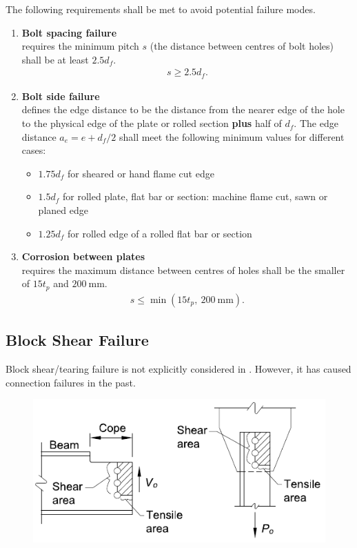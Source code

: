 The following requirements shall be met to avoid potential failure modes.
\begin{figure}[H]
\centering
\end{figure}
\begin{enumerate}
\item \textbf{Bolt spacing failure}\\
 requires the minimum pitch $s$ (the distance between centres of bolt holes) shall be at least $2.5d_f$.
\begin{gather}
s\geqslant2.5d_f.
\end{gather}
\item \textbf{Bolt side failure}\\
 defines the edge distance to be the distance from the nearer edge of the hole to the physical edge of the plate or rolled section \textbf{plus} half of $d_f$. The edge distance $a_e=e+d_f/2$ shall meet the following minimum values for different cases:
\begin{itemize}
\item $1.75d_f$ for sheared or hand flame cut edge
\item $1.5d_f$ for rolled plate, flat bar or section: machine flame cut, sawn or planed edge
\item $1.25d_f$ for rolled edge of a rolled flat bar or section
\end{itemize}
\item \textbf{Corrosion between plates}\\
 requires the maximum distance between centres of holes shall be the smaller of $15t_p$ and $\SI{200}{\mm}$.
\begin{gather}
s\leqslant\min\left(15t_p,~\SI{200}{\mm}\right).
\end{gather}
\end{enumerate}
\subsection{Block Shear Failure}\label{sec:block_failure}
Block shear/tearing failure is not explicitly considered in \NZSSTEEL{}. However, it has caused connection failures in the past.
\begin{figure}[H]
\centering\footnotesize
\includegraphics[scale=1.5]{PIC/CH06/BLOCK}
\end{figure}


